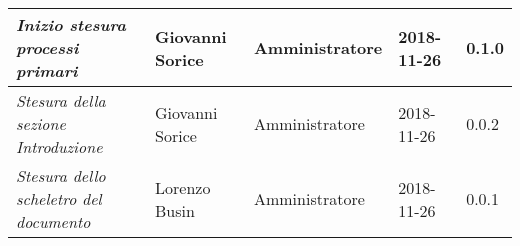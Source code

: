 \begin{table}[H]
\begin{tabular}{p{4cm}|C{3cm}|C{3cm}|R{2.5cm}|R{2cm}}
		\emph{Inizio stesura processi primari} & Giovanni Sorice & Amministratore & 2018-11-26 & 0.1.0 \\
		\hline
		
		\emph{Stesura della sezione Introduzione} & Giovanni Sorice & Amministratore & 2018-11-26 & 0.0.2 \\
		\hline
		
		\emph{Stesura dello scheletro del documento} & Lorenzo Busin & Amministratore & 2018-11-26 & 0.0.1 \\
		
	\end{tabular}
	
\end{table}


\clearpage